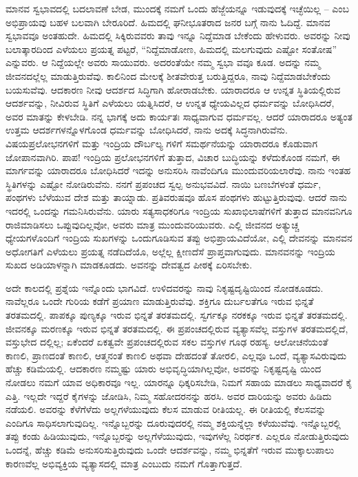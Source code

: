 ಮಾನವ ಸ್ವಭಾವದಲ್ಲಿ ಬದಲಾವಣೆ ಬೇಡ, ಮುಂದಕ್ಕೆ ನಮಗೆ ಒಂದು ಹೆಜ್ಜೆಯನ್ನೂ ಇಡುವುದಕ್ಕೆ ಇಚ್ಛೆಯಿಲ್ಲ – ಎಂಬ ಅಭಿಪ್ರಾಯವು ಬಹಳ ಬಲವಾಗಿ ಬೇರೂರಿದೆ. ಹಿಮದಲ್ಲಿ ಘನೀಭೂತರಾದ ಜನರ ಬಗ್ಗೆ ನಾನು ಓದಿದ್ದೆ. ಮಾನವ ಸ್ವಭಾವವೂ ಅಂತಹುದೇ. ಹಿಮದಲ್ಲಿ ಸಿಕ್ಕಿರುವವರು ತಾವು ಇನ್ನೂ ನಿದ್ದೆಮಾಡ ಬೇಕೆಂದು ಹೇಳುವರು. ಅವರನ್ನು ನೀವು ಬಲಾತ್ಕಾರದಿಂದ ಎಳೆಯಲು ಪ್ರಯತ್ನ ಪಟ್ಟರೆ, “ನಿದ್ದೆಮಾಡೋಣ, ಹಿಮದಲ್ಲಿ ಮಲಗುವುದು ಎಷ್ಟೋ ಸಂತೋಷ” ಎನ್ನುವರು. ಆ ನಿದ್ದೆಯಲ್ಲೇ ಅವರು ಸಾಯುವರು. ಅದರಂತೆಯೇ ನಮ್ಮ ಸ್ವಭಾ ವವೂ ಕೂಡ. ಅದನ್ನು ನಮ್ಮ ಜೀವನದಲ್ಲೆಲ್ಲ ಮಾಡುತ್ತಿರುವೆವು. ಕಾಲಿನಿಂದ ಮೇಲಕ್ಕೆ ಶೀತವೇರುತ್ತ ಬರುತ್ತಿದ್ದರೂ, ನಾವು ನಿದ್ದೆಮಾಡಬೇಕೆಂದು ಬಯಸುವೆವು. ಆದಕಾರಣ ನೀವು ಆದರ್ಶದ ಸಿದ್ಧಿಗಾಗಿ ಹೋರಾಡಬೇಕು. ಯಾರಾದರೂ ಆ ಉನ್ನತ ಸ್ಥಿತಿಯಲ್ಲಿರುವ ಆದರ್ಶವನ್ನು, ನೀವಿರುವ ಸ್ಥಿತಿಗೆ ಎಳೆಯಲು ಯತ್ನಿಸಿದರೆ, ಆ ಉನ್ನತ ಧ್ಯೇಯವಿಲ್ಲದ ಧರ್ಮವನ್ನು ಬೋಧಿಸಿದರೆ, ಅವರ ಮಾತನ್ನು ಕೇಳಬೇಡಿ. ನನ್ನ ಭಾಗಕ್ಕೆ ಅದು ಕಾರ್ಯತಃ ಸಾಧ್ಯವಾಗುವ ಧರ್ಮವಲ್ಲ. ಆದರೆ ಯಾರಾದರೂ ಅತ್ಯಂತ ಉತ್ತಮ ಆದರ್ಶಗಳನ್ನೊಳಗೊಂಡ ಧರ್ಮವನ್ನು ಬೋಧಿಸಿದರೆ, ನಾನು ಅದಕ್ಕೆ ಸಿದ್ಧನಾಗಿರುವೆನು. ವಿಷಯಪ್ರಲೋಭನಗಳಿಗೆ ಮತ್ತು ಇಂದ್ರಿಯ ದೌರ್ಬಲ್ಯ ಗಳಿಗೆ ಸಮರ್ಥನೆಯನ್ನು ಯಾರಾದರೂ ಕೊಡುವಾಗ ಜೋಪಾನವಾಗಿರಿ. ಪಾಪ! ಇಂದ್ರಿಯ ಪ್ರಲೋಭನಗಳಿಗೆ ತುತ್ತಾದ, ವಿಚಾರ ಬುದ್ಧಿಯನ್ನು ಕಳೆದುಕೊಂಡ ನಮಗೆ, ಈ ಮಾರ್ಗವನ್ನು ಯಾರಾದರೂ ಬೋಧಿಸಿದರೆ ಇದನ್ನು ಅನುಸರಿಸಿ ನಾವೆಂದಿಗೂ ಮುಂದುವರಿಯಲಾರೆವು. ನಾನು ಇಂತಹ ಸ್ಥಿತಿಗಳನ್ನು ಎಷ್ಟೋ ನೋಡಿರುವೆನು. ನನಗೆ ಪ್ರಪಂಚದ ಸ್ವಲ್ಪ ಅನುಭವವಿದೆ. ನಾಯಿ ಬಣಬೆಗಳಂತೆ ಧರ್ಮ, ಪಂಥಗಳು ಬೆಳೆಯುವ ದೇಶ ಮತ್ತು ತಾಯ್ನಾಡು. ಪ್ರತಿವರುಷವೂ ಹೊಸ ಪಂಥಗಳು ಹುಟ್ಟುತ್ತಿರುವುವು. ಆದರೆ ನಾನು ಇದರಲ್ಲಿ ಒಂದನ್ನು ಗಮನಿಸಿರುವೆನು. ಯಾರು ಸತ್ಯಸಾಧಕರಿಗೂ ಇಂದ್ರಿಯ ಸುಖಾಭಿಲಾಷೆಗಳಿಗೆ ತುತ್ತಾದ ಮಾನವನಿಗೂ ರಾಜಿಮಾಡಿಸಲು ಒಪ್ಪುವುದಿಲ್ಲವೋ, ಅವರು ಮಾತ್ರ ಮುಂದುವರಿಯುವರು. ಎಲ್ಲಿ ಜೀವನದ ಅತ್ಯುಚ್ಚ ಧ್ಯೇಯಗಳೊಂದಿಗೆ ಇಂದ್ರಿಯ ಸುಖಗಳನ್ನು ಒಂದುಗೂಡಿಸುವ ತಪ್ಪು ಅಭಿಪ್ರಾಯವಿದೆಯೋ, ಎಲ್ಲಿ ದೇವನನ್ನು ಮಾನವನ ಅಧೋಗತಿಗೆ ಎಳೆಯಲು ಪ್ರಯತ್ನ ನಡೆದಿದೆಯೊ, ಅಲ್ಲೆಲ್ಲ ಕ್ಷೀಣದೆಸೆ ಪ್ರಾಪ್ತವಾಗುವುದು. ಮಾನವನನ್ನು ಇಂದ್ರಿಯ ಸುಖದ ಅಡಿಯಾಳನ್ನಾಗಿ ಮಾಡಕೂಡದು. ಅವನನ್ನು ದೇವತ್ವದ ಪೀಠಕ್ಕೆ ಏರಿಸಬೇಕು.

ಅದೇ ಕಾಲದಲ್ಲಿ ಪ್ರಶ್ನೆಯ ಇನ್ನೊಂದು ಭಾಗವಿದೆ. ಉಳಿದವರನ್ನು ನಾವು ನಿಕೃಷ್ಟದೃಷ್ಟಿಯಿಂದ ನೋಡಕೂಡದು. ನಾವೆಲ್ಲರೂ ಒಂದೇ ಗುರಿಯ ಕಡೆಗೆ ಪ್ರಯಾಣ ಮಾಡುತ್ತಿರುವೆವು. ಶಕ್ತಿಗೂ ದುರ್ಬಲತೆಗೂ ಇರುವ ಭಿನ್ನತೆ ತರತಮದಲ್ಲಿ. ಪಾಪಕ್ಕೂ ಪುಣ್ಯಕ್ಕೂ ಇರುವ ಭಿನ್ನತೆ ತರತಮದಲ್ಲಿ. ಸ್ವರ್ಗಕ್ಕೂ ನರಕಕ್ಕೂ ಇರುವ ಭಿನ್ನತೆ ತರತಮದಲ್ಲಿ. ಜೀವನಕ್ಕೂ ಮರಣಕ್ಕೂ ಇರುವ ಭಿನ್ನತೆ ತರತಮದಲ್ಲಿ. ಈ ಪ್ರಪಂಚದಲ್ಲಿರುವ ವ್ಯತ್ಯಾಸವೆಲ್ಲ ವಸ್ತುಗಳ ತರತಮದಲ್ಲಿದೆ, ವಸ್ತುಭೇದ ದಲ್ಲಿಲ್ಲ; ಏಕೆಂದರೆ ಏಕತ್ವವೇ ಪ್ರಪಂಚದಲ್ಲಿರುವ ಸಕಲ ವಸ್ತುಗಳ ಗೂಢ ರಹಸ್ಯ. ಆಲೋಚನೆಯಂತೆ ಕಾಣಲಿ, ಪ್ರಾಣದಂತೆ ಕಾಣಲಿ, ಆತ್ಮನಂತೆ ಕಾಣಲಿ ಅಥವಾ ದೇಹದಂತೆ ತೋರಲಿ, ಎಲ್ಲವೂ ಒಂದೆ, ವ್ಯತ್ಯಾಸವಿರುವುದು ಹೆಚ್ಚು ಕಡಿಮೆಯಲ್ಲಿ. ಆದಕಾರಣ ನಮ್ಮಷ್ಟು ಯಾರು ಅಭಿವೃದ್ಧಿಯಾಗಿಲ್ಲವೋ, ಅವರನ್ನು ನಿಕೃಷ್ಟದೃಷ್ಟಿ ಯಿಂದ ನೋಡಲು ನಮಗೆ ಯಾವ ಅಧಿಕಾರವೂ ಇಲ್ಲ. ಯಾರನ್ನೂ ಧಿಕ್ಕರಿಸಬೇಡಿ, ನಿಮಗೆ ಸಹಾಯ ಮಾಡಲು ಸಾಧ್ಯವಾದರೆ ಕೈ ಎತ್ತಿ. ಇಲ್ಲದೇ ಇದ್ದರೆ ಕೈಗಳನ್ನು ಜೋಡಿಸಿ, ನಿಮ್ಮ ಸಹೋದರನನ್ನು ಹರಸಿ. ಅವರ ದಾರಿಯನ್ನು ಅವರು ಹಿಡಿದು ನಡೆಯಲಿ. ಅವರನ್ನು ಕೆಳೆಗೆಳೆದು ಅಲ್ಲಗಳೆಯುವುದು ಕೆಲಸ ಮಾಡುವ ರೀತಿಯಲ್ಲ. ಈ ರೀತಿಯಲ್ಲಿ ಕೆಲಸವನ್ನು ಎಂದಿಗೂ ಸಾಧಿಸಲಾಗುವುದಿಲ್ಲ. ಇನ್ನೊಬ್ಬರನ್ನು ದೂರುವುದರಲ್ಲಿ ನಮ್ಮ ಶಕ್ತಿಯನ್ನೆಲ್ಲಾ ಕಳೆಯುವೆವು. ಇನ್ನೊಬ್ಬರಲ್ಲಿ ತಪ್ಪು ಕಂಡು ಹಿಡಿಯುವುದು, ಇನ್ನೊಬ್ಬರನ್ನು ಅಲ್ಲಗೆಳೆಯುವುದು, ಇವುಗಳೆಲ್ಲ ನಿರರ್ಥಕ. ಎಲ್ಲರೂ ನೋಡುತ್ತಿರುವುದು ಒಂದನ್ನೆ, ಹೆಚ್ಚು ಕಡಿಮೆ ಅನುಸರಿಸುತ್ತಿರುವುದು ಒಂದೇ ಆದರ್ಶವನ್ನು, ನಮ್ಮ ಭಿನ್ನತೆಗೆ ಇರುವ ಮುಕ್ಕಾಲುಪಾಲು ಕಾರಣವೆಲ್ಲ ಅಭಿವ್ಯಕ್ತಿಯ ವ್ಯತ್ಯಾಸದಲ್ಲಿ ಮಾತ್ರ ಎಂಬುದು ನಮಗೆ ಗೊತ್ತಾಗುತ್ತದೆ.

